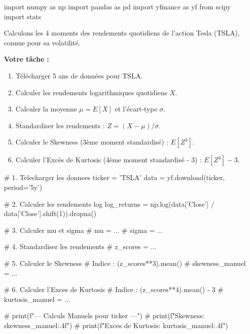 \begin{codecell}
import numpy as np
import pandas as pd
import yfinance as yf
from scipy import stats
\end{codecell}

\begin{exercicebox}
Calculons les 4 moments des rendements quotidiens de l'action Tesla (TSLA), connue pour sa volatilité.

\textbf{Votre tâche :}
\begin{enumerate}
    \item Télécharger 5 ans de données pour TSLA.
    \item Calculer les rendements logarithmiques quotidiens $X$.
    \item Calculer la moyenne $\mu = E[X]$ et l'écart-type $\sigma$.
    \item Standardiser les rendements : $Z = (X - \mu) / \sigma$.
    \item Calculer le Skewness (3ème moment standardisé) : $E[Z^3]$.
    \item Calculer l'Excès de Kurtosis (4ème moment standardisé - 3) : $E[Z^4] - 3$.
\end{enumerate}

\begin{codecell}
# 1. Telecharger les donnees
ticker = 'TSLA'
data = yf.download(ticker, period='5y')

# 2. Calculer les rendements log
log_returns = np.log(data['Close'] / data['Close'].shift(1)).dropna()

# 3. Calculer mu et sigma
# mu = ...
# sigma = ...

# 4. Standardiser les rendements
# z_scores = ...

# 5. Calculer le Skewness
# Indice : (z_scores**3).mean()
# skewness_manuel = ...

# 6. Calculer l'Exces de Kurtosis
# Indice : (z_scores**4).mean() - 3
# kurtosis_manuel = ...

# print(f"--- Calculs Manuels pour {ticker} ---")
# print(f"Skewness: {skewness_manuel:.4f}")
# print(f"Exces de Kurtosis: {kurtosis_manuel:.4f}")
\end{codecell}
\end{exercicebox}

